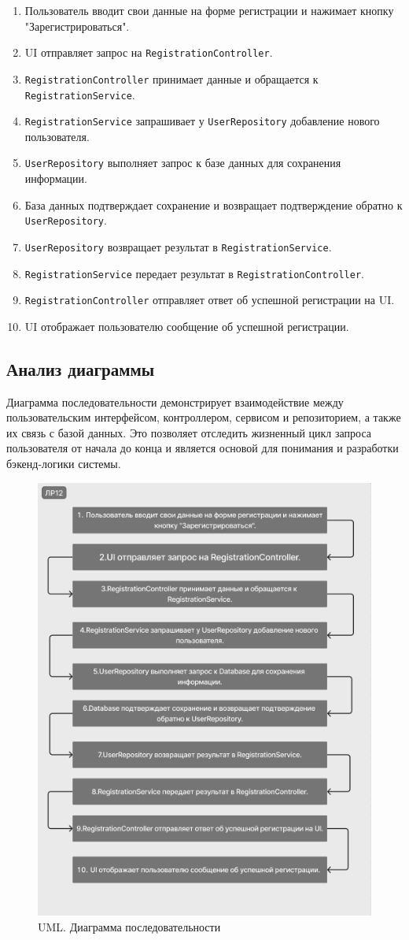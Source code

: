 \documentclass[a4paper,12pt]{article}
\begin{document}
\begin{enumerate}
    \item Пользователь вводит свои данные на форме регистрации и нажимает кнопку "Зарегистрироваться".
    \item UI отправляет запрос на \texttt{RegistrationController}.
    \item \texttt{RegistrationController} принимает данные и обращается к \texttt{RegistrationService}.
    \item \texttt{RegistrationService} запрашивает у \texttt{UserRepository} добавление нового пользователя.
    \item \texttt{UserRepository} выполняет запрос к базе данных для сохранения информации.
    \item База данных подтверждает сохранение и возвращает подтверждение обратно к \texttt{UserRepository}.
    \item \texttt{UserRepository} возвращает результат в \texttt{RegistrationService}.
    \item \texttt{RegistrationService} передает результат в \texttt{RegistrationController}.
    \item \texttt{RegistrationController} отправляет ответ об успешной регистрации на UI.
    \item UI отображает пользователю сообщение об успешной регистрации.
\end{enumerate}

\subsection{Анализ диаграммы}
Диаграмма последовательности демонстрирует взаимодействие между пользовательским интерфейсом, контроллером, сервисом и репозиторием, а также их связь с базой данных. Это позволяет отследить жизненный цикл запроса пользователя от начала до конца и является основой для понимания и разработки бэкенд-логики системы.

\begin{figure}[-h]
    \centering
    \includegraphics[width=0.5\linewidth]{UML_serial.png}
    \caption{UML. Диаграмма последовательности}
\end{figure}
\end{document}

